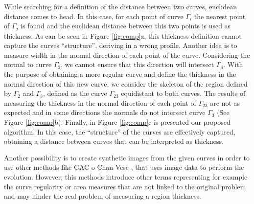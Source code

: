 \documentclass{article}
\begin{document}
While searching for a definition of the distance between two curves, euclidean distance comes to head. In this case, for each point of curve $\Gamma_i$ the nearest point of $\Gamma_j$ is found and the euclidean distance between this two points is used as thickness. As can be seen in Figure \ref{fig:comp}a, this thickness definition cannot capture the curves ``structure'', deriving in a wrong profile. Another idea is to measure width in the normal direction of each point of the curve. Considering the normal to curve $\Gamma_2$, we cannot ensure that this direction will intersect $\Gamma_3$. With the purpose of obtaining a more regular curve and define the thickness in the normal direction of this new curve, we consider the skeleton of the region defined by $\Gamma_2$ and $\Gamma_3$, defined as the curve $\Gamma_{23}$ equidistant to both curves. The results of measuring the thickness in the normal direction of each point of $\Gamma_{23}$ are not as expected and in some directions the normals do not intersect curve $\Gamma_3$ (See Figure \ref{fig:comp}b). Finally, in Figure \ref{fig:comp}c is presented our proposed algorithm. In this case, the ``structure'' of the curves are effectively captured, obtaining a distance between curves that can be interpreted as thickness.

Another possibility is to create synthetic images from the given curves in order to use other methods like GAC \cite{gac} o Chan-Vese \cite{chan-vese}, that uses image data to perform the evolution. However, this methods introduce other terms representing for example the curve regularity or area measures that are not linked to the original problem and may hinder the real problem of measuring a region thickness. 
\end{document}
